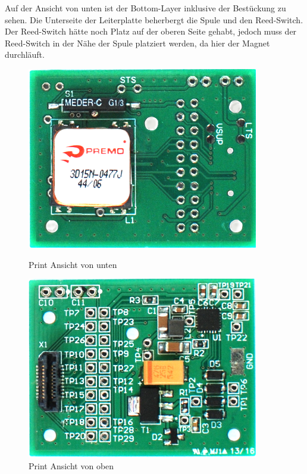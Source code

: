 Auf der Ansicht von unten ist der Bottom-Layer inklusive der Bestückung zu sehen. Die Unterseite der Leiterplatte beherbergt die Spule und den Reed-Switch. Der Reed-Switch hätte noch Platz auf der oberen Seite gehabt, jedoch muss der Reed-Switch in der Nähe der Spule platziert werden, da hier der Magnet durchläuft.

\begin{figure}[ht]
 \begin{minipage}[t]{0.5\textwidth}
    \includegraphics[width=0.9\textwidth]{4Resultate/imag/print_rueckseite.png} 
    \caption{Print Ansicht von unten}
    \label{print_rueckseite}
 \end{minipage}
 \begin{minipage}[t]{0.5\textwidth}
    \includegraphics[width=0.9\textwidth]{4Resultate/imag/print_vorne.png} 
    \caption{Print Ansicht von oben}
    \label{print_vorne}
 \end{minipage}
\end{figure}

